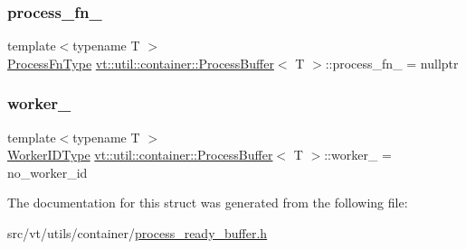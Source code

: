 \mbox{\label{structvt_1_1util_1_1container_1_1_process_buffer_afb8da7548c7c6b2ce3015edd4560a48d}} 
\subsubsection{\texorpdfstring{process\+\_\+fn\+\_\+}{process\_fn\_}}
{\footnotesize\ttfamily template$<$typename T $>$ \\
\hyperlink{structvt_1_1util_1_1container_1_1_process_buffer_a20be3480fb453096015a6fe5ca370816}{Process\+Fn\+Type} \hyperlink{structvt_1_1util_1_1container_1_1_process_buffer}{vt\+::util\+::container\+::\+Process\+Buffer}$<$ T $>$\+::process\+\_\+fn\+\_\+ = nullptr\hspace{0.3cm}{\ttfamily [private]}}

\mbox{\label{structvt_1_1util_1_1container_1_1_process_buffer_aff23f09609cea327a6c6550d51d6b155}} 
\subsubsection{\texorpdfstring{worker\+\_\+}{worker\_}}
{\footnotesize\ttfamily template$<$typename T $>$ \\
\hyperlink{namespacevt_a656e362091da17b9b93d0655b36e3392}{Worker\+I\+D\+Type} \hyperlink{structvt_1_1util_1_1container_1_1_process_buffer}{vt\+::util\+::container\+::\+Process\+Buffer}$<$ T $>$\+::worker\+\_\+ = no\+\_\+worker\+\_\+id\hspace{0.3cm}{\ttfamily [private]}}



The documentation for this struct was generated from the following file\+:\begin{DoxyCompactItemize}
\item 
src/vt/utils/container/\hyperlink{process__ready__buffer_8h}{process\+\_\+ready\+\_\+buffer.\+h}\end{DoxyCompactItemize}
